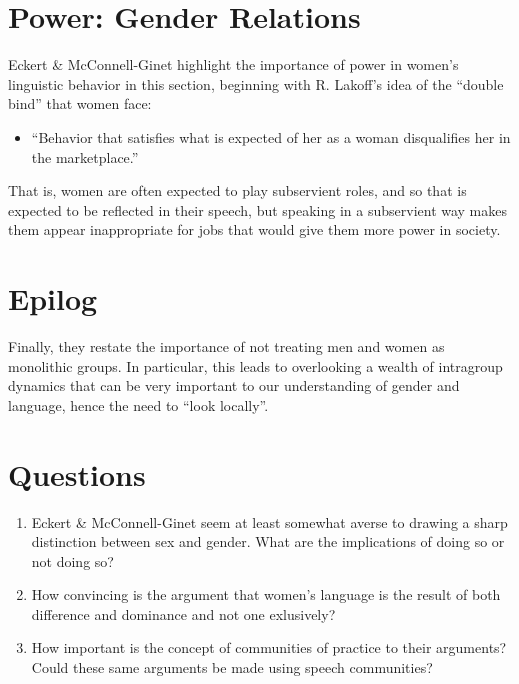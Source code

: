 \documentclass{article}
\begin{document}
  \section{Power: Gender Relations}
    Eckert \& McConnell-Ginet highlight the importance of power in women's linguistic behavior in this section, beginning with R. Lakoff's idea of the ``double bind'' that women face:
    \begin{itemize}
      \item ``Behavior that satisfies what is expected of her as a woman disqualifies her in the marketplace.''
    \end{itemize}
    That is, women are often expected to play subservient roles, and so that is expected to be reflected in their speech, but speaking in a subservient way makes them appear inappropriate for jobs that would give them more power in society.


  \section{Epilog}

    Finally, they restate the importance of not treating men and women as monolithic groups.
    In particular, this leads to overlooking a wealth of intragroup dynamics that can be very important to our understanding of gender and language, hence the need to ``look locally''.
  \section{Questions}
    \begin{enumerate}
      \item Eckert \& McConnell-Ginet seem at least somewhat averse to drawing a sharp distinction between sex and gender. What are the implications of doing so or not doing so?
      \item How convincing is the argument that women's language is the result of both difference and dominance and not one exlusively?
      \item How important is the concept of communities of practice to their arguments? Could these same arguments be made using speech communities?
    \end{enumerate}
\end{document}
